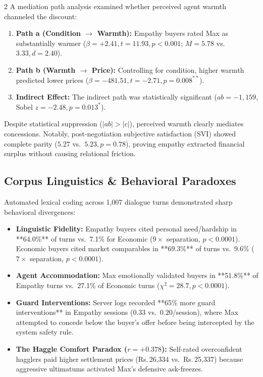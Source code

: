 \documentclass[10pt,a4paper]{article}
\newcommand{\rs}{\textsf{Rs.\,}}
\begin{document}
\begin{multicols}{2}
A mediation path analysis examined whether perceived agent warmth channeled the discount:
\begin{enumerate}
  \item \textbf{Path a (Condition $\to$ Warmth):} Empathy buyers rated Max as substantially warmer ($\beta = +2.41, t = 11.93, p < 0.001$; $M = 5.78$ vs.\ $3.33, d = 2.40$).
  \item \textbf{Path b (Warmth $\to$ Price):} Controlling for condition, higher warmth predicted lower prices ($\beta = -481.51, t = -2.71, p = 0.008^{**}$).
  \item \textbf{Indirect Effect:} The indirect path was statistically significant ($ab = -1{,}159$, Sobel $z = -2.48, p = 0.013^{*}$).
\end{enumerate}

Despite statistical suppression ($|ab| > |c|$), perceived warmth clearly mediates concessions. Notably, post-negotiation subjective satisfaction (SVI) showed complete parity ($5.27$ vs.\ $5.23, p = 0.78$), proving empathy extracted financial surplus without causing relational friction.

\subsection{Corpus Linguistics \& Behavioral Paradoxes}

Automated lexical coding across 1,007 dialogue turns demonstrated sharp behavioral divergences:
\begin{itemize}
  \item \textbf{Linguistic Fidelity:} Empathy buyers cited personal need/hardship in **64.0\%** of turns vs.\ 7.1\% for Economic ($9\times$ separation, $p < 0.0001$). Economic buyers cited market comparables in **69.3\%** of turns vs.\ 9.6\% ($7\times$ separation, $p < 0.0001$).
  \item \textbf{Agent Accommodation:} Max emotionally validated buyers in **51.8\%** of Empathy turns vs.\ 27.1\% of Economic turns ($\chi^2 = 28.7, p < 0.0001$).
  \item \textbf{Guard Interventions:} Server logs recorded **65\% more guard interventions** in Empathy sessions ($0.33$ vs.\ $0.20$/session), where Max attempted to concede below the buyer's offer before being intercepted by the system safety rule.
  \item \textbf{The Haggle Comfort Paradox ($r = +0.378$):} Self-rated overconfident hagglers paid higher settlement prices (\rs26,334 vs.\ \rs25,337) because aggressive ultimatums activated Max's defensive ask-freezes.
\end{itemize}


\end{multicols}
\end{document}
